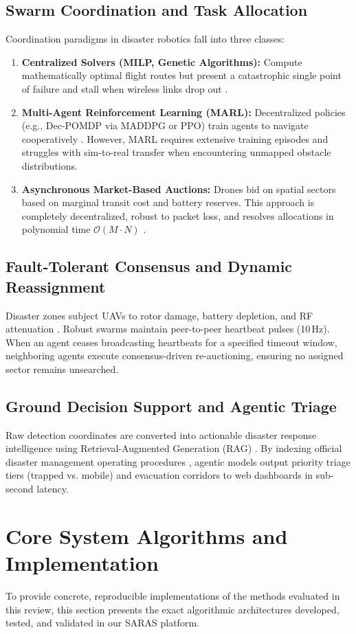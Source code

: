 \documentclass[journal]{IEEEtran}
\begin{document}
\subsection{Swarm Coordination and Task Allocation}
Coordination paradigms in disaster robotics fall into three classes:
\begin{enumerate}
    \item \textbf{Centralized Solvers (MILP, Genetic Algorithms):} Compute mathematically optimal flight routes but present a catastrophic single point of failure and stall when wireless links drop out \cite{2}.
    \item \textbf{Multi-Agent Reinforcement Learning (MARL):} Decentralized policies (e.g., Dec-POMDP via MADDPG or PPO) train agents to navigate cooperatively \cite{1}. However, MARL requires extensive training episodes and struggles with sim-to-real transfer when encountering unmapped obstacle distributions.
    \item \textbf{Asynchronous Market-Based Auctions:} Drones bid on spatial sectors based on marginal transit cost and battery reserves. This approach is completely decentralized, robust to packet loss, and resolves allocations in polynomial time $\mathcal{O}(M \cdot N)$ \cite{2}.
\end{enumerate}

\subsection{Fault-Tolerant Consensus and Dynamic Reassignment}
Disaster zones subject UAVs to rotor damage, battery depletion, and RF attenuation \cite{21}. Robust swarms maintain peer-to-peer heartbeat pulses (10\,Hz). When an agent ceases broadcasting heartbeats for a specified timeout window, neighboring agents execute consensus-driven re-auctioning, ensuring no assigned sector remains unsearched.

\subsection{Ground Decision Support and Agentic Triage}
Raw detection coordinates are converted into actionable disaster response intelligence using Retrieval-Augmented Generation (RAG) \cite{24}. By indexing official disaster management operating procedures \cite{25}, agentic models output priority triage tiers (trapped vs. mobile) and evacuation corridors to web dashboards in sub-second latency.

\section{Core System Algorithms and Implementation}
To provide concrete, reproducible implementations of the methods evaluated in this review, this section presents the exact algorithmic architectures developed, tested, and validated in our SARAS platform.
\end{document}
